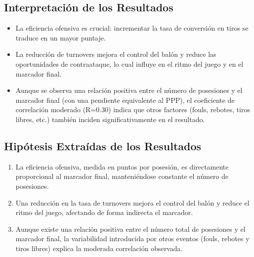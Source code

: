 \documentclass[12pt]{article}
\begin{document}
\subsection{Interpretación de los Resultados}
\begin{itemize}
	\item La eficiencia ofensiva es crucial: incrementar la tasa de conversión en tiros se traduce en un mayor puntaje.
	\item La reducción de turnovers mejora el control del balón y reduce las oportunidades de contraataque, lo cual influye en el ritmo del juego y en el marcador final.
	\item Aunque se observa una relación positiva entre el número de posesiones y el marcador final (con una pendiente equivalente al PPP), el coeficiente de correlación moderado (R=0.30) indica que otros factores (fouls, rebotes, tiros libres, etc.) también inciden significativamente en el resultado.
\end{itemize}

\subsection{Hipótesis Extraídas de los Resultados}
\begin{enumerate}
	\item La eficiencia ofensiva, medida en puntos por posesión, es directamente proporcional al marcador final, manteniéndose constante el número de posesiones.
	\item Una reducción en la tasa de turnovers mejora el control del balón y reduce el ritmo del juego, afectando de forma indirecta el marcador.
	\item Aunque existe una relación positiva entre el número total de posesiones y el marcador final, la variabilidad introducida por otros eventos (fouls, rebotes y tiros libres) explica la moderada correlación observada.
\end{enumerate}
\end{document}
